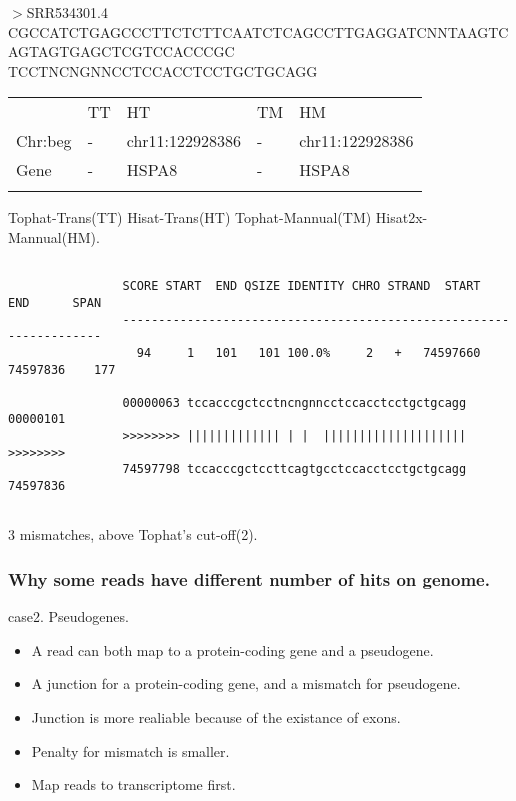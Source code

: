 \begin{frame}[c,fragile]
	\begin{examples}
		$>$SRR534301.4\\
		\tiny{CGCCATCTGAGCCCTTCTCTTCAATCTCAGCCTTGAGGATCNNTAAGTCAGTAGTGAGCTCGTCCACCCGC\\TCCTNCNGNNCCTCCACCTCCTGCTGCAGG} \\
		\tiny{
			\begin{table}
			\centering
			\begin{tabular}{  C{1cm}  C{1.2cm}  C{1.2cm}  C{1.2cm}  C{1.2cm}  }
			\hline\noalign{\smallskip}
						& TT 	& HT  &	TM	 & HM  	\\
			\noalign{\smallskip}\hline\noalign{\smallskip}
			Chr:beg	&	-		& chr11:122928386   & - & chr11:122928386	\\
			Gene		&	-  	& HSPA8             & - & HSPA8          	\\
			\noalign{\smallskip}\hline 
			\end{tabular}
			\end{table}
		}
		\scriptsize{Tophat-Trans(TT) Hisat-Trans(HT) Tophat-Mannual(TM) Hisat2x-Mannual(HM).}
		\begin{lstlisting}[basicstyle=\tiny]
			
				SCORE START  END QSIZE IDENTITY CHRO STRAND  START    END      SPAN
				-------------------------------------------------------------------
				  94     1   101   101 100.0%     2   +   74597660  74597836    177
		
				00000063 tccacccgctcctncngnncctccacctcctgctgcagg 00000101
				>>>>>>>> ||||||||||||| | |  |||||||||||||||||||| >>>>>>>>
				74597798 tccacccgctccttcagtgcctccacctcctgctgcagg 74597836
		
		\end{lstlisting}
		\alert{3 mismatches}, above Tophat's cut-off(2).
		\end{examples}
	
\end{frame}

\begin{frame}[c,fragile]
	\frametitle{ Why some reads have different number of hits on genome. }
	\begin{block}{ case2. Pseudogenes.  }
		\begin{itemize}
			\item A read can both map to a protein-coding gene and a pseudogene. \\ \pause
			\item A junction for a protein-coding gene, and a mismatch for pseudogene. \\ \pause
			\item Junction is more realiable because of the existance of exons.	\\ \pause
			\item Penalty for mismatch is smaller.	\\ \pause
			\item Map reads to \alert{transcriptome first}.
		\end{itemize}
	\end{block}
\end{frame}


